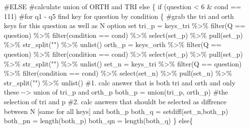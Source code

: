 \documentclass[
  letterpaper,
  DIV=11,
  numbers=noendperiod]{scrreprt}
\newenvironment{Shaded}{\begin{snugshade}}{\end{snugshade}}
\newcommand{\CommentTok}[1]{\textcolor[rgb]{0.37,0.37,0.37}{#1}}
\newcommand{\ControlFlowTok}[1]{\textcolor[rgb]{0.00,0.23,0.31}{#1}}
\newcommand{\DecValTok}[1]{\textcolor[rgb]{0.68,0.00,0.00}{#1}}
\newcommand{\FunctionTok}[1]{\textcolor[rgb]{0.28,0.35,0.67}{#1}}
\newcommand{\NormalTok}[1]{\textcolor[rgb]{0.00,0.23,0.31}{#1}}
\newcommand{\OtherTok}[1]{\textcolor[rgb]{0.00,0.23,0.31}{#1}}
\newcommand{\SpecialCharTok}[1]{\textcolor[rgb]{0.37,0.37,0.37}{#1}}
\newcommand{\StringTok}[1]{\textcolor[rgb]{0.13,0.47,0.30}{#1}}
\begin{document}
\begin{Shaded}
\begin{Highlighting}[]
  \CommentTok{\#ELSE }
  \CommentTok{\#calculate union of ORTH and TRI}
  \ControlFlowTok{else}\NormalTok{ \{}
    \ControlFlowTok{if}\NormalTok{ (question }\SpecialCharTok{\textless{}} \DecValTok{6} \SpecialCharTok{\&}\NormalTok{ cond }\SpecialCharTok{==} \DecValTok{111}\NormalTok{) }\CommentTok{\#for q1 {-} q5 find key for question by condition}
\NormalTok{  \{}
     \CommentTok{\#grab the tri and orth keys for this question as well as N option set}
\NormalTok{     tri\_p }\OtherTok{=}\NormalTok{  keys\_tri }\SpecialCharTok{\%\textgreater{}\%}  \FunctionTok{filter}\NormalTok{(Q }\SpecialCharTok{==}\NormalTok{ question) }\SpecialCharTok{\%\textgreater{}\%} \FunctionTok{filter}\NormalTok{(condition }\SpecialCharTok{==}\NormalTok{ cond) }\SpecialCharTok{\%\textgreater{}\%} \FunctionTok{select}\NormalTok{(set\_p) }\SpecialCharTok{\%\textgreater{}\%} \FunctionTok{pull}\NormalTok{(set\_p) }\SpecialCharTok{\%\textgreater{}\%} \FunctionTok{str\_split}\NormalTok{(}\StringTok{""}\NormalTok{) }\SpecialCharTok{\%\textgreater{}\%} \FunctionTok{unlist}\NormalTok{()}
\NormalTok{     orth\_p }\OtherTok{=}\NormalTok{ keys\_orth }\SpecialCharTok{\%\textgreater{}\%} \FunctionTok{filter}\NormalTok{(Q }\SpecialCharTok{==}\NormalTok{ question) }\SpecialCharTok{\%\textgreater{}\%} \FunctionTok{filter}\NormalTok{(condition }\SpecialCharTok{==}\NormalTok{ cond) }\SpecialCharTok{\%\textgreater{}\%} \FunctionTok{select}\NormalTok{(set\_p) }\SpecialCharTok{\%\textgreater{}\%} \FunctionTok{pull}\NormalTok{(set\_p) }\SpecialCharTok{\%\textgreater{}\%} \FunctionTok{str\_split}\NormalTok{(}\StringTok{""}\NormalTok{) }\SpecialCharTok{\%\textgreater{}\%} \FunctionTok{unlist}\NormalTok{()}
\NormalTok{     set\_n }\OtherTok{=}\NormalTok{  keys\_tri }\SpecialCharTok{\%\textgreater{}\%}  \FunctionTok{filter}\NormalTok{(Q }\SpecialCharTok{==}\NormalTok{ question) }\SpecialCharTok{\%\textgreater{}\%} \FunctionTok{filter}\NormalTok{(condition }\SpecialCharTok{==}\NormalTok{ cond) }\SpecialCharTok{\%\textgreater{}\%} \FunctionTok{select}\NormalTok{(set\_n) }\SpecialCharTok{\%\textgreater{}\%} \FunctionTok{pull}\NormalTok{(set\_n) }\SpecialCharTok{\%\textgreater{}\%} \FunctionTok{str\_split}\NormalTok{(}\StringTok{""}\NormalTok{) }\SpecialCharTok{\%\textgreater{}\%} \FunctionTok{unlist}\NormalTok{() }
     \CommentTok{\#1. calc answer that is both tri and orth and only these {-}{-}\textgreater{} union of tri\_p and orth\_p}
\NormalTok{     both\_p }\OtherTok{=} \FunctionTok{union}\NormalTok{(tri\_p, orth\_p) }\CommentTok{\#the selection of tri and p}
     \CommentTok{\#2. calc answers that should\textquotesingle{}t be selected as diffrence between N [same for all keys] and both\_p}
\NormalTok{     both\_q }\OtherTok{=} \FunctionTok{setdiff}\NormalTok{(set\_n,both\_p)}
\NormalTok{     both\_pn }\OtherTok{=} \FunctionTok{length}\NormalTok{(both\_p)}
\NormalTok{     both\_qn }\OtherTok{=} \FunctionTok{length}\NormalTok{(both\_q)}
\NormalTok{  \} }\ControlFlowTok{else}\NormalTok{\{}
    

\end{Highlighting}
\end{Shaded}
\end{document}
